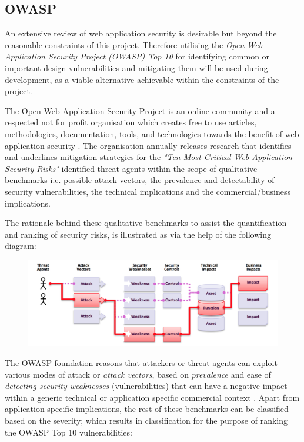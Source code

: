 \subsection{OWASP}

An extensive review of web application security is desirable but beyond the reasonable constraints of this project. Therefore  utilising the \textit{Open Web Application Security Project (OWASP) Top 10} \cite{OWASP2017} for identifying common or important design vulnerabilities and mitigating them will be used during development, as a viable alternative achievable within the constraints of the project.

The Open Web Application Security Project is an online community  and  a respected  not for profit organisation which creates free to use articles, methodologies, documentation, tools, and technologies towards the benefit of web application security \cite{OWASP}. The organisation  annually releases research that identifies and underlines mitigation strategies for the \textit{"Ten Most Critical Web Application Security Risks"}\cite{OWASP2017} identified threat agents within the scope of qualitative benchmarks i.e. possible attack vectors, the prevalence and detectability of security vulnerabilities, the technical implications and the commercial/business implications.

The rationale behind these qualitative benchmarks to assist the quantification and ranking of security risks,  is illustrated as via the help of the following diagram:

\begin{figure}[H]
	\centering
	\includegraphics[scale=0.5]{figures/attack}
	\label{fig:Consideration of Threat Agents}
\end{figure}

The OWASP foundation reasons \cite{OWASP2017} that attackers or threat agents can exploit various modes of attack or \textit{attack vectors}, based on \textit{prevalence} and ease of \textit{detecting security weaknesses} (vulnerabilities) that can have a negative impact  within a generic technical or application specific commercial context \cite{OWASP2017}. Apart from application specific implications, the rest of these benchmarks can be classified based on the severity; which results in classification for the purpose of ranking the OWASP Top 10 vulnerabilities:

